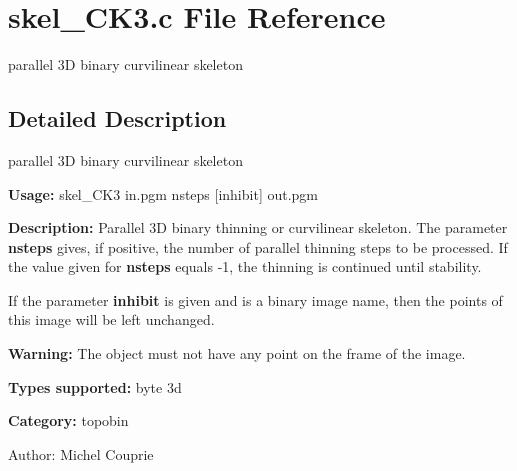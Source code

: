 \section{skel\_\-CK3.c File Reference}
\label{skel__CK3_8c}
parallel 3D binary curvilinear skeleton 



\subsection{Detailed Description}
parallel 3D binary curvilinear skeleton 

{\bf Usage:} skel\_\-CK3 in.pgm nsteps [inhibit] out.pgm

{\bf Description:} Parallel 3D binary thinning or curvilinear skeleton. The parameter {\bf nsteps} gives, if positive, the number of parallel thinning steps to be processed. If the value given for {\bf nsteps} equals -1, the thinning is continued until stability.

If the parameter {\bf inhibit} is given and is a binary image name, then the points of this image will be left unchanged.

{\bf Warning:} The object must not have any point on the frame of the image.

{\bf Types supported:} byte 3d

{\bf Category:} topobin

\begin{Desc}
\item[Author:]Michel Couprie \end{Desc}
